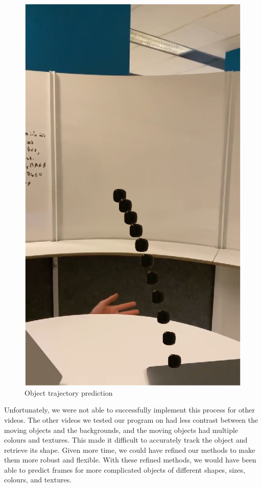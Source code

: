 \documentclass[12pt]{article}
\begin{document}
\begin{figure}[h]
  \centering
    \includegraphics[scale=0.5]{figures/object_trajectory_prediction.png}
    \caption{Object trajectory prediction}
    \label{Object trajectory prediction}
\end{figure}

Unfortunately, we were not able to successfully implement this process for other videos. The other videos we tested our program on had less contrast between the moving objects and the backgrounds, and the moving objects had multiple colours and textures. This made it difficult to accurately track the object and retrieve its shape. Given more time, we could have refined our methods to make them more robust and flexible. With these refined methods, we would have been able to predict frames for more complicated objects of different shapes, sizes, colours, and textures.
\end{document}
